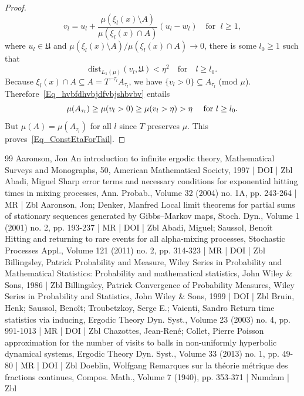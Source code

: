 \documentclass[10pt]{amsart}
\theoremstyle{definition}\newtheorem{defi}[theo]{Definition}\newtheorem{rema}[theo]{Remark}\newtheorem{exam}[theo]{Example}\newtheorem{exem}[theo]{Example}\newtheorem{nota}[theo]{Notation}
\newcommand{\dist}{\mathrm{dist}}
\newcommand{\frkU}{\mathfrak{U}}
\begin{document}
\begin{proof}
\[
v_{l}=u_{l}+\frac{\mu(\xi_{l}(x)\setminus A)}{\mu(\xi_{l}(x)\cap A)} (u_{l}-w_{l})\quad \text{for }\;l\geq1,
\]
where $u_{l}\in\frkU$ and $\mu(\xi_{l}(x)\setminus A)/\mu(\xi _{l}(x)\cap A)\rightarrow0$, there is some $l_{0}\geq1$ such that
\[
\dist_{L_{1}(\mu)}\left(v_{l},\frkU\right)<\eta^{2}\quad\text{for}\quad l\geq l_{0}.
\]
Because $\xi_{l}(x)\cap A\subseteq A=T^{-\tau_{l}}A_{\tau_{l}}$, we have $\{v_{l}>0\}\subseteq A_{\tau_{l}}$ (mod $\mu$). Therefore~\eqref{Eq_hvbfdhvbjdfvbjshbvbv} entails
\[
\mu(A_{\tau_{l}})\geq\mu(v_{l}>0)\geq\mu(v_{l}>\eta)>\eta\text{ \quad for }l\geq l_{0}\text{.}
\]
But $\mu(A)=\mu(A_{\tau_{l}})$ for all $l$ since $T$ preserves $\mu$. This proves~\eqref{Eq_ConstEtaForTail}.\qedhere
\end{proof}



\begin{thebibliography}{99}
Aaronson, Jon An introduction to infinite ergodic theory, Mathematical Surveys and Monographs, 50, American Mathematical Society, 1997 | DOI | Zbl
Abadi, Miguel Sharp error terms and necessary conditions for exponential hitting times in mixing processes, Ann. Probab., Volume 32 (2004) no. 1A, pp. 243-264 | MR | Zbl
Aaronson, Jon; Denker, Manfred Local limit theorems for partial sums of stationary sequences generated by Gibbs–Markov maps, Stoch. Dyn., Volume 1 (2001) no. 2, pp. 193-237 | MR | DOI | Zbl
Abadi, Miguel; Saussol, Benoît Hitting and returning to rare events for all alpha-mixing processes, Stochastic Processes Appl., Volume 121 (2011) no. 2, pp. 314-323 | MR | DOI | Zbl
Billingsley, Patrick Probability and Measure, Wiley Series in Probability and Mathematical Statistics: Probability and mathematical statistics, John Wiley \& Sons, 1986 | Zbl
Billingsley, Patrick Convergence of Probability Measures, Wiley Series in Probability and Statistics, John Wiley \& Sons, 1999 | DOI | Zbl
Bruin, Henk; Saussol, Benoît; Troubetzkoy, Serge E.; Vaienti, Sandro Return time statistics via inducing, Ergodic Theory Dyn. Syst., Volume 23 (2003) no. 4, pp. 991-1013 | MR | DOI | Zbl
Chazottes, Jean-René; Collet, Pierre Poisson approximation for the number of visits to balls in non-uniformly hyperbolic dynamical systems, Ergodic Theory Dyn. Syst., Volume 33 (2013) no. 1, pp. 49-80 | MR | DOI | Zbl
Doeblin, Wolfgang Remarques sur la théorie métrique des fractions continues, Compos. Math., Volume 7 (1940), pp. 353-371 | Numdam | Zbl

\end{thebibliography}
\end{document}
